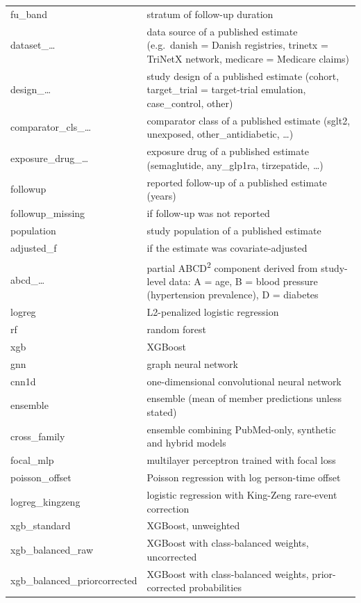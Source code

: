 \documentclass[journal]{IEEEtran}
\begin{document}
{\begin{longtable}[]{@{}
  >{\raggedright\arraybackslash}p{}
  >{\raggedright\arraybackslash}p{}@{}}
fu\_band & stratum of follow-up duration \\
dataset\_\ldots{} & data source of a published estimate (e.g.~danish =
Danish registries, trinetx = TriNetX network, medicare = Medicare
claims) \\
design\_\ldots{} & study design of a published estimate (cohort,
target\_trial = target-trial emulation, case\_control, other) \\
comparator\_cls\_\ldots{} & comparator class of a published estimate
(sglt2, unexposed, other\_antidiabetic, \ldots) \\
exposure\_drug\_\ldots{} & exposure drug of a published estimate
(semaglutide, any\_glp1ra, tirzepatide, \ldots) \\
followup & reported follow-up of a published estimate (years) \\
followup\_missing & 1 if follow-up was not reported \\
population & study population of a published estimate \\
adjusted\_f & 1 if the estimate was covariate-adjusted \\
abcd\_\ldots{} & partial ABCD\textsuperscript{2} component derived from study-level data:
A = age, B = blood pressure (hypertension prevalence), D = diabetes \\
logreg & L2-penalized logistic regression \\
rf & random forest \\
xgb & XGBoost \\
gnn & graph neural network \\
cnn1d & one-dimensional convolutional neural network \\
ensemble & ensemble (mean of member predictions unless stated) \\
cross\_family & ensemble combining PubMed-only, synthetic and hybrid
models \\
focal\_mlp & multilayer perceptron trained with focal loss \\
poisson\_offset & Poisson regression with log person-time offset \\
logreg\_kingzeng & logistic regression with King-Zeng rare-event
correction \\
xgb\_standard & XGBoost, unweighted \\
xgb\_balanced\_raw & XGBoost with class-balanced weights, uncorrected \\
xgb\_balanced\_priorcorrected & XGBoost with class-balanced weights,
prior-corrected probabilities \\

\end{longtable}}
\end{document}
